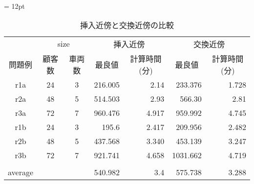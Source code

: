 \begin{table}[]
\tabcolsep = 12pt
\caption{挿入近傍と交換近傍の比較}
\label{insert}
\begin{tabular}{ccccrcr}
\hline
    & \multicolumn{2}{c}{size} & \multicolumn{2}{c}{挿入近傍}                          & \multicolumn{2}{c}{交換近傍}                         \\ \cline{2-7}
問題例 & 顧客数           &  車両数          & 最良値                      & \multicolumn{1}{c}{計算時間(分)} & 最良値                      & \multicolumn{1}{c}{計算時間(分)} \\ \cline{2-7}
r1a & 24          & 3          & \multicolumn{1}{r}{216.005} & 2.14                     & \multicolumn{1}{r}{233.376} & 1.728                    \\
r2a & 48          & 5          & \multicolumn{1}{r}{514.503}  & 2.93                      & \multicolumn{1}{r}{566.30}  & 2.81                     \\
r3a & 72         & 7          & \multicolumn{1}{r}{960.476} & 4.917                     & \multicolumn{1}{r}{959.992} & 4.745                   \\
r1b & 24          & 3          & \multicolumn{1}{r}{195.6} & 2.417                     & \multicolumn{1}{r}{209.956} & 2.482                     \\
r2b & 48          & 5          & \multicolumn{1}{r}{437.568} & 3.340                     & \multicolumn{1}{r}{453.139} & 3.247                     \\
r3b & 72         & 7          & \multicolumn{1}{r}{921.741} & 4.658                   & \multicolumn{1}{r}{1031.662} & 4.719                 \\
& \multicolumn{1}{c}{} & \multicolumn{1}{l}{} &                          &                           &                         &                               \\
 \multicolumn{1}{c}{average} & \multicolumn{1}{c}{} &                          &   \multicolumn{1}{r}{540.982}                        &    \multicolumn{1}{r}{3.4}                      &  \multicolumn{1}{r}{575.738}  &     \multicolumn{1}{r}{3.288}                        \\
\hline
\end{tabular}
\end{table}



